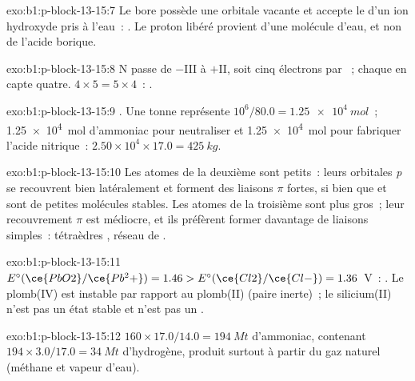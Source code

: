 \begin{solution}{exo:b1:p-block-13-15:7}
Le bore possède une orbitale vacante et accepte le 
d'un ion hydroxyde pris à l'eau~: .
Le proton libéré provient d'une molécule d'eau, et non de l'acide
borique.
\end{solution}

\begin{solution}{exo:b1:p-block-13-15:8}
N passe de $-$III à $+$II, soit cinq électrons par ~; chaque
 en capte
quatre. $4 \times 5 = 5 \times 4$~: .
\end{solution}

\begin{solution}{exo:b1:p-block-13-15:9}
. Une tonne représente $10^6/80.0 = \qty{1.25e4}{mol}$~;
\qty{1.25e4}{mol} d'ammoniac pour neutraliser et \qty{1.25e4}{mol} pour
fabriquer l'acide nitrique~: $2.50 \times 10^4 \times 17.0 = \qty{425}{kg}$.
\end{solution}

\begin{solution}{exo:b1:p-block-13-15:10}
Les atomes de la deuxième  sont petits~: leurs orbitales
\textit{p} se recouvrent bien latéralement et forment des liaisons $\pi$
fortes, si bien que  et  sont de petites molécules
stables. Les atomes de la troisième  sont plus gros~; leur
recouvrement $\pi$ est médiocre, et ils préfèrent former davantage de
liaisons simples~: tétraèdres , réseau de .
\end{solution}

\begin{solution}{exo:b1:p-block-13-15:11}
$E^\circ(\ce{PbO2}/\ce{Pb^2+}) = 1.46 > E^\circ(\ce{Cl2}/\ce{Cl-}) = 1.36$~V~:
. Le plomb(IV) est instable
par rapport au plomb(II) (paire inerte)~; le silicium(II) n'est pas un
état stable et
 n'est pas un .
\end{solution}

\begin{solution}{exo:b1:p-block-13-15:12}
$160 \times 17.0/14.0 = \qty{194}{Mt}$ d'ammoniac, contenant $194 \times
3.0/17.0 = \qty{34}{Mt}$ d'hydrogène, produit surtout à partir du gaz
naturel (méthane et vapeur d'eau).
\end{solution}

